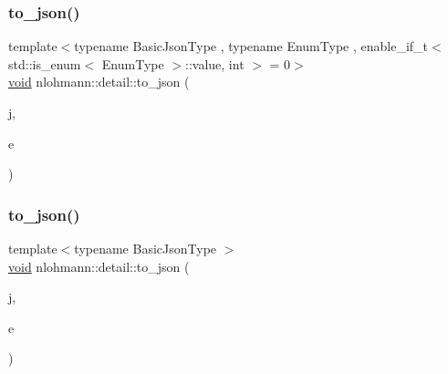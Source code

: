 \mbox{\label{namespacenlohmann_1_1detail_a0c8b159dba71981d6c555d284cf6e2bf}} 
\subsubsection{\texorpdfstring{to\+\_\+json()}{to\_json()}\hspace{0.1cm}{\footnotesize\ttfamily [7/17]}}
{\footnotesize\ttfamily template$<$typename Basic\+Json\+Type , typename Enum\+Type , enable\+\_\+if\+\_\+t$<$ std\+::is\+\_\+enum$<$ Enum\+Type $>$\+::value, int $>$  = 0$>$ \\
\hyperlink{namespacenlohmann_1_1detail_a59fca69799f6b9e366710cb9043aa77d}{void} nlohmann\+::detail\+::to\+\_\+json (\begin{DoxyParamCaption}\item[{Basic\+Json\+Type \&}]{j,  }\item[{Enum\+Type}]{e }\end{DoxyParamCaption})\hspace{0.3cm}{\ttfamily [noexcept]}}

\mbox{\label{namespacenlohmann_1_1detail_aeca6fb5fede5ed1e12a4420d98a5692b}} 
\subsubsection{\texorpdfstring{to\+\_\+json()}{to\_json()}\hspace{0.1cm}{\footnotesize\ttfamily [8/17]}}
{\footnotesize\ttfamily template$<$typename Basic\+Json\+Type $>$ \\
\hyperlink{namespacenlohmann_1_1detail_a59fca69799f6b9e366710cb9043aa77d}{void} nlohmann\+::detail\+::to\+\_\+json (\begin{DoxyParamCaption}\item[{Basic\+Json\+Type \&}]{j,  }\item[{const std\+::vector$<$ bool $>$ \&}]{e }\end{DoxyParamCaption})}

\mbox{\label{namespacenlohmann_1_1detail_a3afebc132c5ff83f9cd160e52030fdfd}} 
